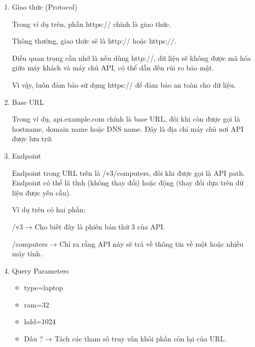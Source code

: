\begin{enumerate}
    \item Giao thức (Protocol)

Trong ví dụ trên, phần https:// chính là giao thức.

Thông thường, giao thức sẽ là http:// hoặc https://.

Điều quan trọng cần nhớ là nếu dùng http://, dữ liệu sẽ không được mã hóa giữa máy khách và máy chủ API, có thể dẫn đến rủi ro bảo mật.

Vì vậy, luôn đảm bảo sử dụng https:// để đảm bảo an toàn cho dữ liệu.

    \item Base URL

Trong ví dụ, api.example.com chính là base URL, đôi khi còn được gọi là hostname, domain name hoặc DNS name.
Đây là địa chỉ máy chủ nơi API được lưu trữ.

    \item Endpoint
    
Endpoint trong URL trên là /v3/computers, đôi khi được gọi là API path.
Endpoint có thể là tĩnh (không thay đổi) hoặc động (thay đổi dựa trên dữ liệu được yêu cầu).

Ví dụ trên có hai phần:

/v3 → Cho biết đây là phiên bản thứ 3 của API.

/computers → Chỉ ra rằng API này sẽ trả về thông tin về một hoặc nhiều máy tính.

    \item  Query Parameters
    

\begin{tcolorbox}[title=Các tham số truy vấn trong ví dụ là:]
\begin{itemize}
    \item type=laptop

    \item ram=32

    \item hdd=1024
\end{itemize}
\end{tcolorbox}


\begin{tcolorbox}[title=Chúng được xác định bởi hai dấu phân cách:]
\begin{itemize}
    \item Dấu ? → Tách các tham số truy vấn khỏi phần còn lại của URL.


\end{itemize}
\end{tcolorbox}
\end{enumerate}
